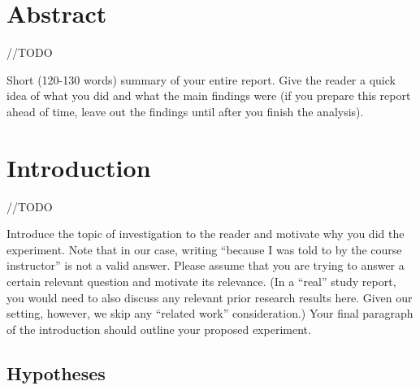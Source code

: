 \documentclass[unicode,11pt,a4paper,oneside,numbers=endperiod,openany]{scrartcl}
\begin{document}
\setassignment
{}

\newline


\section{Abstract}

//TODO 

Short (120-130 words) summary of your entire report. Give the reader a quick idea of what you did and what the main findings were (if you prepare this report ahead of time, leave out the findings until after you finish the analysis).


\section{Introduction}

//TODO 

Introduce the topic of investigation to the reader and motivate why you did the experiment. Note that in our case, writing “because I was told to by the course instructor” is not a valid answer. Please assume that you are trying to answer a certain relevant question and motivate its relevance. (In a “real” study report, you would need to also discuss any relevant prior research results here. Given our setting, however, we skip any “related work” consideration.) Your final paragraph of the introduction should outline your proposed experiment.


    \subsection{Hypotheses}
\end{document}
